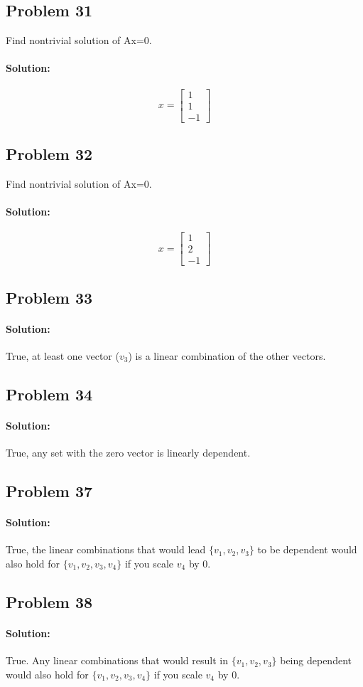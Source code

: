 \documentclass[11pt, notitlepage]{report}
\newenvironment{solution}{\paragraph{\small Solution:}}{\hfill}
\begin{document}
\subsection{Problem 31}
Find nontrivial solution of Ax=0.
\begin{solution}
\[
x=\begin{bmatrix}
1\\
1\\
-1	
\end{bmatrix}
\]
\end{solution}

\subsection{Problem 32}
Find nontrivial solution of Ax=0.
\begin{solution}
\[
x=\begin{bmatrix}
1\\
2\\
-1	
\end{bmatrix}
\]
\end{solution}

\subsection{Problem 33}
\begin{solution}
True, at least one vector ($v_3$) is a linear combination of the other vectors.
\end{solution}

\subsection{Problem 34}
\begin{solution}
True, any set with the zero vector is linearly dependent.
\end{solution}

\subsection{Problem 37}
\begin{solution}
True, the linear combinations that would lead $\{v_1,v_2,v_3\}$ to be dependent would also hold for $\{v_1,v_2,v_3,v_4\}$ if you scale $v_4$ by $0$.
\end{solution}

\subsection{Problem 38}
\begin{solution}
True. Any linear combinations that would result in $\{v_1,v_2,v_3\}$ being dependent would also hold for $\{v_1,v_2,v_3,v_4\}$ if you scale $v_4$ by $0$.
\end{solution}
\end{document}

